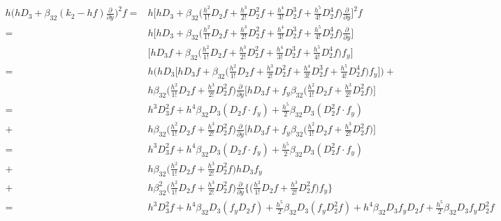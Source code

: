 \documentclass[12 pt]{article}
\begin{document}
{
\large
\begin{align*}
h\bigg(hD_{3}+\beta_{32}(k_{2}-hf)\frac{\partial}{\partial y}\bigg)^{2}f =& h\bigg[hD_{3} + \beta_{32}\bigg(\frac{h^{2}}{1!}D_{2}f + \frac{h^{3}}{2!}D_{2}^{2}f + \frac{h^{4}}{3!}D_{2}^{3}f + \frac{h^{5}}{4!}D_{2}^{4}f\bigg)\frac{\partial}{\partial y}\bigg]^{2}f\\
																		=& h\bigg[hD_{3} + \beta_{32}\bigg(\frac{h^{2}}{1!}D_{2}f + \frac{h^{3}}{2!}D_{2}^{2}f + \frac{h^{4}}{3!}D_{2}^{3}f + \frac{h^{5}}{4!}D_{2}^{4}f\bigg)\frac{\partial}{\partial y}\bigg]\\
																		&\bigg[hD_{3}f + \beta_{32}\bigg(\frac{h^{2}}{1!}D_{2}f + \frac{h^{3}}{2!}D_{2}^{2}f + \frac{h^{4}}{3!}D_{2}^{3}f + \frac{h^{5}}{4!}D_{2}^{4}f\bigg)f_{y}\bigg]\\
																		=& h\bigg(hD_{3}\bigg[hD_{3}f + \beta_{32}\bigg(\frac{h^{2}}{1!}D_{2}f + \frac{h^{3}}{2!}D_{2}^{2}f + \frac{h^{4}}{3!}D_{2}^{3}f + \frac{h^{5}}{4!}D_{2}^{4}f\bigg)f_{y}\bigg]\bigg)+\\
																		&h\beta_{32}\bigg(\frac{h^{2}}{1!}D_{2}f + \frac{h^{3}}{2!}D_{2}^{2}f\bigg)\frac{\partial}{\partial y}\bigg[hD_{3}f + f_{y}\beta_{32}\bigg(\frac{h^{2}}{1!}D_{2}f + \frac{h^{3}}{2!}D_{2}^{2}f \bigg)\bigg]\\
																		=& h^{3}D_{3}^{2}f + h^{4}\beta_{32}D_{3}(D_{2}f\cdot f_{y}) + \frac{h^{5}}{2}\beta_{32}D_{3}(D_{2}^{2}f\cdot f_{y}) \\
																		+& h\beta_{32}\bigg(\frac{h^{2}}{1!}D_{2}f + \frac{h^{3}}{2!}D_{2}^{2}f\bigg)\frac{\partial}{\partial y}\bigg[hD_{3}f + f_{y}\beta_{32}\bigg(\frac{h^{2}}{1!}D_{2}f + \frac{h^{3}}{2!}D_{2}^{2}f\bigg)\bigg]\\
																		=& h^{3}D_{3}^{2}f + h^{4}\beta_{32}D_{3}(D_{2}f\cdot f_{y}) + \frac{h^{5}}{2}\beta_{32}D_{3}(D_{2}^{2}f\cdot f_{y})\\
																		+& h\beta_{32}\bigg(\frac{h^{2}}{1!}D_{2}f + \frac{h^{3}}{2!}D_{2}^{2}f\bigg)hD_{3}f_{y}\\
																		+& h\beta_{32}^{2}\bigg(\frac{h^{2}}{1!}D_{2}f + \frac{h^{3}}{2!}D_{2}^{2}f\bigg)\frac{\partial}{\partial y}\bigg\{\bigg(\frac{h^{2}}{1!}D_{2}f + \frac{h^{3}}{2!}D_{2}^{2}f\bigg)f_{y}\bigg\}\\
																		=& h^{3}D_{3}^{2}f + h^{4}\beta_{32}D_{3}(f_{y}D_{2}f) + \frac{h^{5}}{2}\beta_{32}D_{3}(f_{y}D_{2}^{2}f) + h^{4}\beta_{32}D_{3}f_{y}D_{2}f + \frac{h^{5}}{2}\beta_{32}D_{3}f_{y}D_{2}^{2}f\\

\end{align*}}
\end{document}
